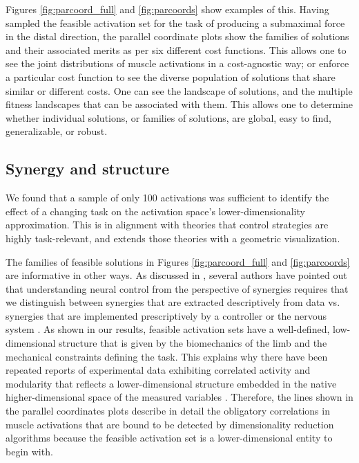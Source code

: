 \documentclass[10pt,letterpaper]{article}
\begin{document}
Figures \ref{fig:parcoord_full} and \ref{fig:parcoords} show examples of this. Having sampled the feasible activation set for the task of producing a submaximal force in the distal direction, the parallel coordinate plots show the families of solutions and their associated merits as per six different cost functions.  This allows one to see the joint distributions of muscle activations in  a cost-agnostic way; or enforce a particular cost function to see the diverse population of solutions that share similar or different costs. One can see  the landscape of solutions, and the multiple fitness landscapes that can be associated with them. This allows one to determine whether individual solutions, or families of solutions, are global, easy to find, generalizable, or robust.

\subsection*{Synergy and structure}
We found that a sample of only 100 activations was sufficient to identify the effect of a changing task on the activation space's lower-dimensionality approximation. This is in alignment with theories that control strategies are highly task-relevant, and extends those theories with a geometric visualization.


The families of feasible solutions in Figures \ref{fig:parcoord_full} and \ref{fig:parcoords} are informative in other ways. As discussed  in  \cite{valero-cuevas2015fundamentals}, several authors have pointed out that  understanding neural control from the perspective of synergies requires that we  distinguish between synergies that are extracted descriptively from data vs. synergies that are implemented prescriptively by a controller or the nervous system \cite{alessandro2013musclesynergies,kutch2012challenges,tresch2009case,scholz1999uncontrolled}. As shown in our results, feasible activation sets have a well-defined, low-dimensional structure that is given by the biomechanics of the limb and the mechanical constraints defining the task. This explains why there have been repeated reports of experimental data exhibiting correlated activity and modularity that reflects a lower-dimensional structure embedded in the native higher-dimensional space of the measured variables \cite{Frontiers2012Modularity}. Therefore, the lines shown in the parallel coordinates plots describe in detail the obligatory correlations in muscle activations that are bound to be detected by dimensionality reduction algorithms because the feasible activation set is a lower-dimensional entity to begin with.
\end{document}
